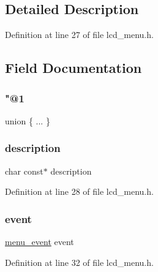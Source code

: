 \subsection{Detailed Description}


Definition at line 27 of file lcd\+\_\+menu.\+h.



\subsection{Field Documentation}
\mbox{\label{struct_menu_entry___a59f9cb02ab5a1313406f1e2cd170f5e3}} 
\subsubsection{\texorpdfstring{"@1}{@1}}
{\footnotesize\ttfamily union \{ ... \} }

\mbox{\label{struct_menu_entry___af92f126a07a2944ef81db37d6e6e21ae}} 
\subsubsection{\texorpdfstring{description}{description}}
{\footnotesize\ttfamily char const$\ast$ description}



Definition at line 28 of file lcd\+\_\+menu.\+h.

\mbox{\label{struct_menu_entry___aab46a1780779046bc38a2421e1b9dd36}} 
\subsubsection{\texorpdfstring{event}{event}}
{\footnotesize\ttfamily \mbox{\hyperlink{lcd__menu_8h_af281888756940391027a7bdddf347718}{menu\+\_\+event}} event}



Definition at line 32 of file lcd\+\_\+menu.\+h.

\mbox{\label{struct_menu_entry___a02edaa08d1665685fd949ffa77675ef2}} 
